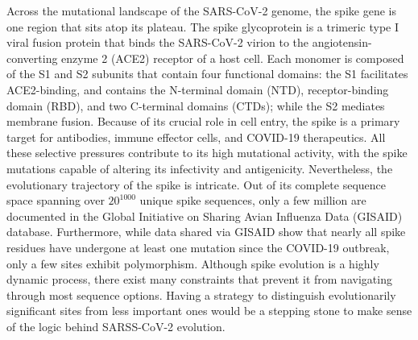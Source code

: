 \documentclass[aps,prl,amsmath,amssymb,floatfix,twocolumn, amsmath, superscriptaddress, onecolumn]{revtex4}
\begin{document}
Across the mutational landscape of the SARS-CoV-2 genome, the spike gene is one region that sits atop its plateau.\cite{10.1016/j.jcv.2020.104441, 10.1002/jmv.26744, 10.3390/ijms24109072} The spike glycoprotein is a trimeric type I viral fusion protein that binds the SARS-CoV-2 virion to the angiotensin-converting enzyme 2 (ACE2) receptor of a host cell.\cite{10.1038/s41580-021-00418-x} Each monomer is composed of the S1 and S2 subunits that contain four functional domains: the S1 facilitates ACE2-binding,\cite{Renhong2020, Benton2020} and contains the N-terminal domain (NTD), receptor-binding domain (RBD), and two C-terminal domains (CTDs); while the S2 mediates membrane fusion.\cite{Hoffman_multibasic2020} Because of its crucial role in cell entry,\cite{10.1038/s41580-021-00418-x} the spike is a primary target for antibodies,\cite{Walls2020, 10.1126/science.abd0827} immune effector cells,\cite{10.1016/j.xcrm.2021.100354, 10.1038/s41590-021-01122-w} and COVID-19 therapeutics.\cite{10.1038/s41401-020-0485-4, 10.1038/s41577-020-00480-0, su_molecular_2021} All these selective pressures contribute to its high mutational activity, with the spike mutations capable of altering its infectivity and antigenicity.\cite{Chen2021, science371.abg4493, harvey_sars-cov-2_2021, 10.1038/s41579-022-00841-7, 10.1038/s41579-023-00878-2} Nevertheless, the evolutionary trajectory of the spike is intricate. Out of its complete sequence space spanning over $20^{1000}$ unique spike sequences, only a few million are documented in the Global Initiative on Sharing Avian Influenza Data (GISAID) database.\cite{gisaid} Furthermore, while data shared via GISAID show that nearly all spike residues have undergone at least one mutation since the COVID-19 outbreak, only a few sites exhibit polymorphism. Although spike evolution is a highly dynamic process, there exist many constraints that prevent it from navigating through most sequence options.\cite{10.1038/nrm2762,10.1128/mmbr.05023-11, 10.1371/journal.pcbi.1009147, 10.1146/annurev-immunol-072621-084422} Having a strategy to distinguish evolutionarily significant sites from less important ones would be a stepping stone to make sense of the logic behind SARSS-CoV-2 evolution.
\end{document}
